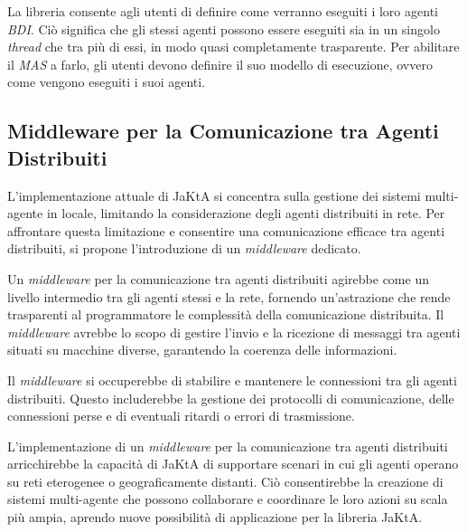 La libreria consente agli utenti di definire come verranno eseguiti i loro agenti \textit{BDI}. Ciò significa che gli stessi agenti possono essere eseguiti sia in un singolo \textit{thread} che tra più di essi, in modo quasi completamente trasparente. Per abilitare il \textit{MAS} a farlo, gli utenti devono definire il suo modello di esecuzione, ovvero come vengono eseguiti i suoi agenti.

\subsection{Middleware per la Comunicazione tra Agenti Distribuiti}

L'implementazione attuale di JaKtA si concentra sulla gestione dei sistemi multi-agente in locale, limitando la considerazione degli agenti distribuiti in rete. Per affrontare questa limitazione e consentire una comunicazione efficace tra agenti distribuiti, si propone l'introduzione di un \textit{middleware} dedicato.

Un \textit{middleware} per la comunicazione tra agenti distribuiti agirebbe come un livello intermedio tra gli agenti stessi e la rete, fornendo un'astrazione che rende trasparenti al programmatore le complessità della comunicazione distribuita. Il \textit{middleware} avrebbe lo scopo di gestire l'invio e la ricezione di messaggi tra agenti situati su macchine diverse, garantendo la coerenza delle informazioni.

Il \textit{middleware} si occuperebbe di stabilire e mantenere le connessioni tra gli agenti distribuiti. Questo includerebbe la gestione dei protocolli di comunicazione, delle connessioni perse e di eventuali ritardi o errori di trasmissione.

L'implementazione di un \textit{middleware} per la comunicazione tra agenti distribuiti arricchirebbe la capacità di JaKtA di supportare scenari in cui gli agenti operano su reti eterogenee o geograficamente distanti. Ciò consentirebbe la creazione di sistemi multi-agente che possono collaborare e coordinare le loro azioni su scala più ampia, aprendo nuove possibilità di applicazione per la libreria JaKtA.